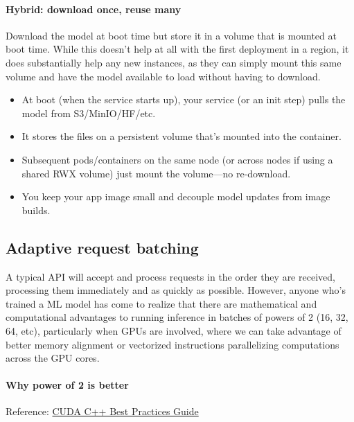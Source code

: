 \paragraph{Hybrid: download once, reuse many}

Download the model at boot time but store it in a volume that is mounted at boot time. While this doesn't help at all with the first deployment in a region, it does substantially help any new instances, as they can simply mount this same volume and have the model available to load without having to download. 

\begin{itemize}
	\item At boot (when the service starts up), your service (or an init step) pulls the model from S3/MinIO/HF/etc.
	\item It stores the files on a persistent volume that's mounted into the container.
	\item Subsequent pods/containers on the same node (or across nodes if using a shared RWX volume) just mount the volume—no re-download.
	\item You keep your app image small and decouple model updates from image builds.
\end{itemize}


\subsection{Adaptive request batching}
A typical API will accept and process requests in the order they are received, processing them immediately and as quickly as possible. However, anyone who's trained a ML model has come to realize that there are mathematical and computational advantages to running inference in batches of powers of 2 (16, 32, 64, etc), particularly when GPUs are involved, where we can take advantage of better memory alignment or vectorized instructions parallelizing computations across the GPU cores.  

\paragraph{Why power of 2 is better}

Reference: \href{https://docs.nvidia.com/cuda/cuda-c-best-practices-guide/index.html}{CUDA C++ Best Practices Guide}

